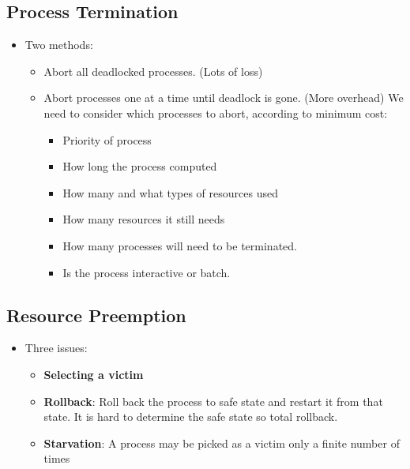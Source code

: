 \documentclass[10pt]{report}
\begin{document}
		\subsection{Process Termination}
			\begin{itemize}
				\item Two methods:
				\begin{itemize}
					\item Abort all deadlocked processes. (Lots of loss)
					\item Abort processes one at a time until deadlock is gone. (More overhead) We need to consider which processes to abort, according to minimum cost:
					\begin{itemize}
						\item Priority of process
						\item How long the process computed
						\item How many and what types of resources used
						\item How many resources it still needs
						\item How many processes will need to be terminated.
						\item Is the process interactive or batch.
					\end{itemize}
				\end{itemize}
			\end{itemize}

		\subsection{Resource Preemption}
			\begin{itemize}
				\item Three issues:
				\begin{itemize}
					\item \textbf{Selecting a victim}
					\item \textbf{Rollback}: Roll back the process to safe state and restart it from that state. It is hard to determine the safe state so total rollback.
					\item \textbf{Starvation}: A process may be picked as a victim only a finite number of times
				\end{itemize}
			\end{itemize}


\end{document}
